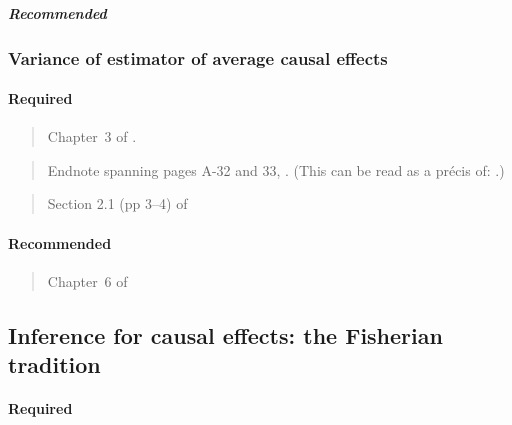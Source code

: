 \documentclass[12pt]{article}
\begin{document}
\subparagraph{Recommended}

\begin{verse}  \end{verse}
\begin{verse}  \end{verse}

\subsubsection{Variance of estimator of average causal effects} 

\paragraph*{Required}

\begin{verse}
  Chapter~3 of .
\end{verse}

\begin{verse} Endnote spanning pages A-32 and 33,
  .  (This can be read as a pr{\'e}cis
  of: .)
\end{verse}

\begin{verse} Section 2.1 (pp 3--4) of  \end{verse}

\paragraph*{Recommended}

\begin{verse} Chapter~6 of  \end{verse}

\begin{verse}  \end{verse}

\begin{verse}  \end{verse}

\subsection{Inference for causal effects: the Fisherian tradition}

\paragraph*{Required}
\end{document}
